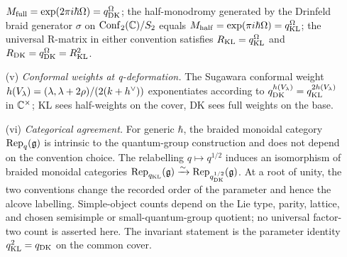 \begin{theorem}
\begin{enumerate}
$M_{\mathrm{full}} = \exp(2\pi i \hbar \Omega) = q_{\DK}^{\Omega}$;
the half-monodromy generated by the Drinfeld braid generator
$\sigma$ on $\Conf_{2}(\bbC)/S_{2}$ equals
$M_{\mathrm{half}} = \exp(\pi i \hbar \Omega) = q_{\KL}^{\Omega}$;
the universal R-matrix in either convention satisfies
$R_{\KL} = q_{\KL}^{\Omega}$ and $R_{\DK} = q_{\DK}^{\Omega} =
R_{\KL}^{2}$.
\item[\textup{(v)}] \emph{Conformal weights at q-deformation.}
The Sugawara conformal weight $h(V_{\lambda}) =
(\lambda, \lambda + 2\rho)/(2(k + h^{\vee}))$ exponentiates
according to $q_{\mathrm{DK}}^{h(V_{\lambda})} = q_{\mathrm{KL}}^{2 h(V_{\lambda})}$
in $\mathbb{C}^{\times}$; KL sees half-weights on the cover, DK sees full
weights on the base.
\item[\textup{(vi)}] \emph{Categorical agreement.}
For generic $\hbar$, the braided monoidal category
$\mathrm{Rep}_{q}(\mathfrak{g})$ is intrinsic to the quantum-group construction
and does not depend on the convention choice. The relabelling
$q \mapsto q^{1/2}$ induces an isomorphism of braided monoidal
categories
$\mathrm{Rep}_{q_{\mathrm{KL}}}(\mathfrak{g}) \xrightarrow{\sim} \mathrm{Rep}_{q_{\mathrm{DK}}^{1/2}}(\mathfrak{g})$.
At a root of unity, the two conventions change the recorded order
of the parameter and hence the alcove labelling. Simple-object
counts depend on the Lie type, parity, lattice, and chosen
semisimple or small-quantum-group quotient; no universal factor-two
count is asserted here. The invariant statement is the parameter
identity $q_{\mathrm{KL}}^{2}=q_{\mathrm{DK}}$ on the common cover.
\end{enumerate}
\end{theorem}

